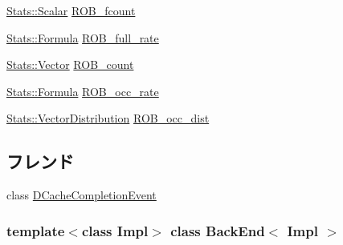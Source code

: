 \begin{DoxyCompactItemize}
\item 
\hyperlink{classStats_1_1Scalar}{Stats::Scalar} \hyperlink{classBackEnd_ac41e5b42959e2f75c51c9fec633e2491}{ROB\_\-fcount}
\item 
\hyperlink{classStats_1_1Formula}{Stats::Formula} \hyperlink{classBackEnd_a4e4aad30eb153b8d15da02cf33e57e9c}{ROB\_\-full\_\-rate}
\item 
\hyperlink{classStats_1_1Vector}{Stats::Vector} \hyperlink{classBackEnd_a4ccaf3f968ca2c525ff6934f5dc202a4}{ROB\_\-count}
\item 
\hyperlink{classStats_1_1Formula}{Stats::Formula} \hyperlink{classBackEnd_ac6bfab47ea686c39b71e475aec8b07ca}{ROB\_\-occ\_\-rate}
\item 
\hyperlink{classStats_1_1VectorDistribution}{Stats::VectorDistribution} \hyperlink{classBackEnd_ace261e0da7b5ca53fcfc3a27782418c4}{ROB\_\-occ\_\-dist}
\end{DoxyCompactItemize}
\subsection*{フレンド}
\begin{DoxyCompactItemize}
\item 
class \hyperlink{classBackEnd_a27227be5511e316f17702a3a99fb0b98}{DCacheCompletionEvent}
\end{DoxyCompactItemize}
\subsubsection*{template$<$class Impl$>$ class BackEnd$<$ Impl $>$}



